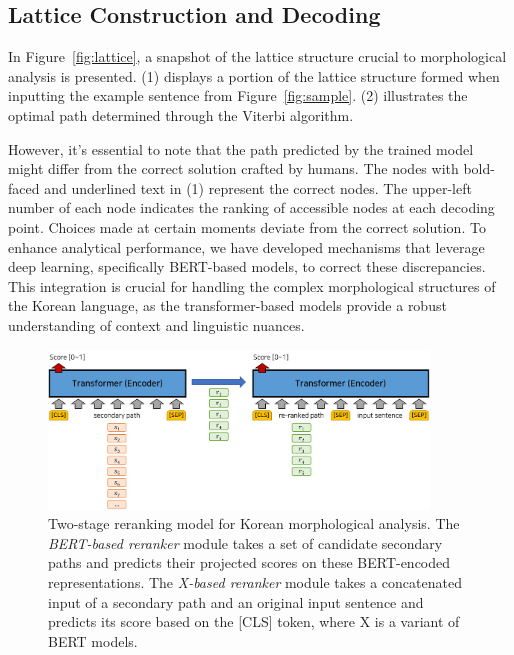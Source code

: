 \documentclass[AMS,STIX2COL]{WileyNJD-v2}
\begin{document}
    \subsection{Lattice Construction and Decoding}\label{subsec:lattice-construction-and-decoding}

    In Figure~\ref{fig:lattice}, a snapshot of the lattice structure crucial to morphological analysis is presented.
    (1) displays a portion of the lattice structure formed when inputting the example sentence from Figure~\ref{fig:sample}.
    (2) illustrates the optimal path determined through the Viterbi algorithm.

    However, it's essential to note that the path predicted by the trained model might differ from the correct solution crafted by humans.
    The nodes with bold-faced and underlined text in (1) represent the correct nodes.
    The upper-left number of each node indicates the ranking of accessible nodes at each decoding point.
    Choices made at certain moments deviate from the correct solution.
    To enhance analytical performance, we have developed mechanisms that leverage deep learning, specifically BERT-based models, to correct these discrepancies.
    This integration is crucial for handling the complex morphological structures of the Korean language, as the transformer-based models provide a robust understanding of context and linguistic nuances.

    \begin{figure}[ht]
        \centerline{\includegraphics[width=0.9\textwidth]{fig;ranking-v2}}
        \caption{Two-stage reranking model for Korean morphological analysis. The \textit{BERT-based reranker} module takes a set of candidate secondary paths and predicts their projected scores on these BERT-encoded representations. The \textit{X-based reranker} module takes a concatenated input of a secondary path and an original input sentence and predicts its score based on the [CLS] token, where X is a variant of BERT models.}
        \label{fig:ranking}
    \end{figure}
\end{document}
